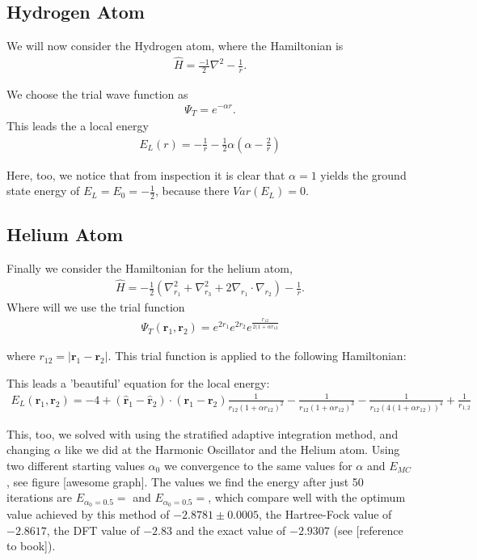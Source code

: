 \subsection{Hydrogen Atom}
We will now consider the Hydrogen atom, where the Hamiltonian is
\begin{align}
  \hat{H} = \frac{-1}{2}\nabla^2 - \frac{1}{r}.
\end{align}

We choose the trial wave function as
  \begin{align}
    \Psi_T = e^{-\alpha r}.
  \end{align}
This leads the a local energy
  \begin{align}
    E_L(r) = - \frac{1}{r} - \frac{1}{2}\alpha(\alpha - \frac{2}{r})
  \end{align}

Here, too, we notice that from inspection it is clear that $\alpha = 1$ yields the ground state energy of $E_L = E_0 = -\frac{1}{2}$, because there $Var(E_L) = 0$.




\subsection{Helium Atom}
Finally we consider the Hamiltonian for the helium atom,
\begin{align}
  \hat{H} = -\frac{1}{2}(\nabla_{r_1}^2 + \nabla_{r_3}^2 + 2\nabla_{r_1}\cdot \nabla_{r_2}) - \frac{1}{r}.
\end{align}
Where will we use the trial function
  \begin{align}
    \Psi_T (\textbf{r}_1,\textbf{r}_2) = e^{2r_1}e^{2r_2}e^{\frac{r_{12}}{2(1+\alpha r_{12}}}
  \end{align}

where $r_{12} = |\textbf{r}_1 - \textbf{r}_2 |$. This trial function is applied to the following Hamiltonian:


This leads a 'beautiful' equation for the local energy:
  \begin{align}
    E_L(\textbf{r}_1,\textbf{r}_2) = -4  + (\hat{\textbf{r}}_1 - \hat{\textbf{r}}_2) \cdot (\textbf{r}_1 - \textbf{r}_2) \frac{1}{r_{12}(1+\alpha r_{12})^2} -  \frac{1}{r_{12}(1+\alpha r_{12})^3} - \frac{1}{r_{12}(4(1+\alpha r_{12}))^4} + \frac{1}{r_{1,2}}   \end{align}
  
This, too, we solved with using the stratified adaptive integration method, and changing $\alpha$ like we did at the Harmonic Oscillator and the Helium atom. Using two different starting values $\alpha_0$ we convergence to the same values for $\alpha$ and $E_{MC}$, see figure [awesome graph]. The values we find the energy after just 50 iterations are $E_{\alpha_0 = 0.5} =  $ and $E_{\alpha_0 = 0.5} =  $, which compare well with the optimum value achieved by this method of $-2.8781 \pm 0.0005$, the Hartree-Fock value of $-2.8617$, the DFT value of $-2.83$ and the exact value of $-2.9307$ (see [reference to book]). 

